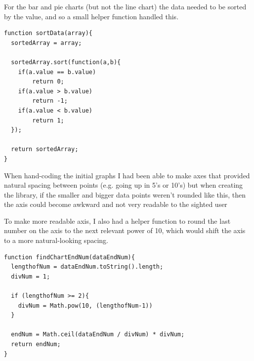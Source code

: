 \documentclass[ %
                    author={Aleena Baig},
                supervisor={Dr Simon Lock},
                    degree={BSc},
                     title={On Making Web Accessible Graphs},
                  subtitle={},
                      year={2019} ]{dissertation}
\begin{document}
For the bar and pie charts (but not the line chart) the data needed to be sorted by the value, and so a small helper function handled this.

\begin{lstlisting}
function sortData(array){
  sortedArray = array;

  sortedArray.sort(function(a,b){
    if(a.value == b.value)
        return 0;
    if(a.value > b.value)
        return -1;
    if(a.value < b.value)
        return 1;
  });

  return sortedArray;
}
\end{lstlisting}

When hand-coding the initial graphs I had been able to make axes that provided natural spacing between points (e.g. going up in 5's or 10's) but when creating the library, if the smaller and bigger data points weren't rounded like this, then the axis could become awkward and not very readable to the sighted user

To make more readable axis, I also had a helper function to round the last number on the axis to the next relevant power of 10, which would shift the axis to a more natural-looking spacing.

\begin{lstlisting}
function findChartEndNum(dataEndNum){
  lengthofNum = dataEndNum.toString().length;
  divNum = 1;

  if (lengthofNum >= 2){
    divNum = Math.pow(10, (lengthofNum-1))
  }

  endNum = Math.ceil(dataEndNum / divNum) * divNum;
  return endNum;
}
\end{lstlisting}
\end{document}

